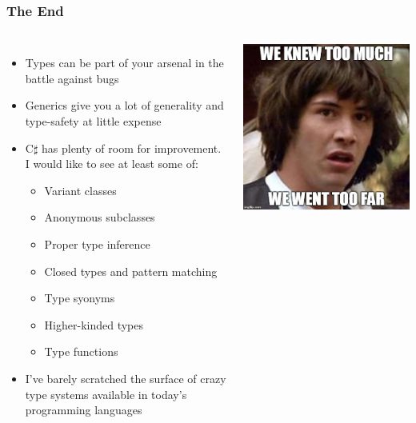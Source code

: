 \documentclass{beamer}
\begin{document}
  \begin{frame}
    \frametitle{The End}
    \begin{columns}
      \begin{itemize}
        \item Types can be part of your arsenal in the battle against bugs
        \item Generics give you a lot of generality and type-safety at little expense
        \item C$\sharp$ has plenty of room for improvement. I would like to see at least some of:
        \begin{itemize}
          \item Variant classes
          \item Anonymous subclasses
          \item Proper type inference
          \item Closed types and pattern matching
          \item Type syonyms
          \item Higher-kinded types
          \item Type functions
        \end{itemize}
        \item I've barely scratched the surface of crazy type systems available in today's programming languages
      \end{itemize}
      \includegraphics[scale=0.25]{keanu.jpg}
    \end{columns}
  \end{frame}
\end{document}
